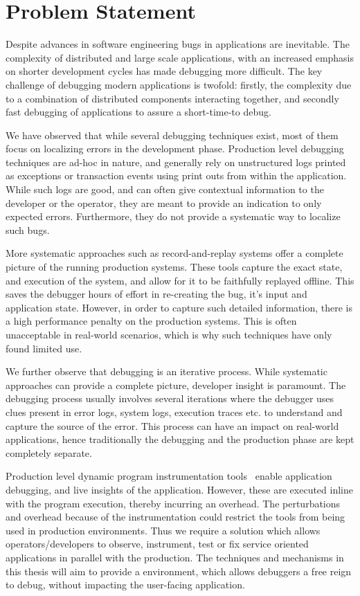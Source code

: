 \section{Problem Statement}
\label{sec:introProblemStatement}

Despite advances in software engineering bugs in applications are inevitable.
The complexity of distributed and large scale applications, with an increased emphasis on shorter development cycles has made debugging more difficult.
The key challenge of debugging modern applications is twofold: firstly, the complexity due to a combination of distributed components interacting together, and secondly fast debugging of applications to assure a short-time-to debug.

We have observed that while several debugging techniques exist, most of them focus on localizing errors in the development phase.
Production level debugging techniques are ad-hoc in nature, and generally rely on unstructured logs printed as exceptions or transaction events using print outs from within the application.
While such logs are good, and can often give contextual information to the developer or the operator, they are meant to provide an indication to only expected errors.
Furthermore, they do not provide a systematic way to localize such bugs.

More systematic approaches such as record-and-replay systems offer a complete picture of the running production systems.
These tools capture the exact state, and execution of the system, and allow for it to be faithfully replayed offline.
This saves the debugger hours of effort in re-creating the bug, it's input and application state.
However, in order to capture such detailed information, there is a high performance penalty on the production systems.
This is often unacceptable in real-world scenarios, which is why such techniques have only found limited use.

We further observe that debugging is an iterative process.
While systematic approaches can provide a complete picture, developer insight is paramount.
The debugging process usually involves several iterations where the debugger uses clues present in error logs, system logs, execution traces etc. to understand and capture the source of the error.
This process can have an impact on real-world applications, hence traditionally the debugging and the production phase are kept completely separate.

Production level dynamic program instrumentation tools~\cite{dtrace,systemtap,winetw} enable application debugging, and live insights of the application. 
However, these are executed inline with the program execution, thereby incurring an overhead.
The perturbations and overhead because of the instrumentation could restrict the tools from being used in production environments. 
Thus we require a solution which allows operators/developers to observe, instrument, test or fix service oriented applications in parallel with the production. 
The techniques and mechanisms in this thesis will aim to provide a \livedebugging environment, which allows debuggers a free reign to debug, without impacting the user-facing application.

